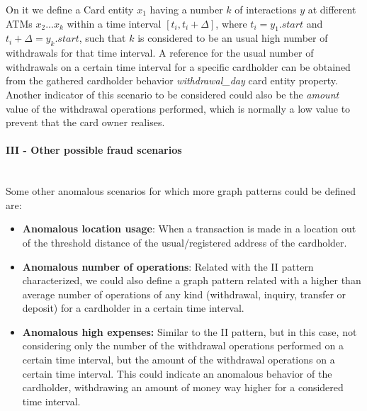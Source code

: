 On it we define a Card entity $x_1$ having a number $k$ of interactions $y$ at different ATMs $x_2 ... x_k$ within a time interval $[t_i, t_i + \Delta]$, where $t_i = y_1.\textit{start}$ and $t_i + \Delta = y_k.\textit{start}$, such that $k$ is considered to be an usual high number of withdrawals for that time interval. A reference for the usual number of withdrawals on a certain time interval for a specific cardholder can be obtained from the gathered cardholder behavior \emph{withdrawal\_day} card entity property.
Another indicator of this scenario to be considered could also be the \emph{amount} value of the withdrawal operations performed, which is normally a low value to prevent that the card owner realises.


\paragraph{III - Other possible fraud scenarios\\\\}

Some other anomalous scenarios for which more graph patterns could be defined are:
\begin{itemize}
    \item \textbf{Anomalous location usage}: When a transaction is made in a location out of the threshold distance of the usual/registered address of the cardholder.
    \item \textbf{Anomalous number of operations}: Related with the II pattern characterized, we could also define a graph pattern related with a higher than average number of operations of any kind (withdrawal, inquiry, transfer or deposit) for a cardholder in a certain time interval.
    \item \textbf{Anomalous high expenses:} Similar to the II pattern, but in this case, not considering only the number of the withdrawal operations performed on a certain time interval, but the amount of the withdrawal operations on a certain time interval. This could indicate an anomalous behavior of the cardholder, withdrawing an amount of money way higher for a considered time interval.
\end{itemize}


